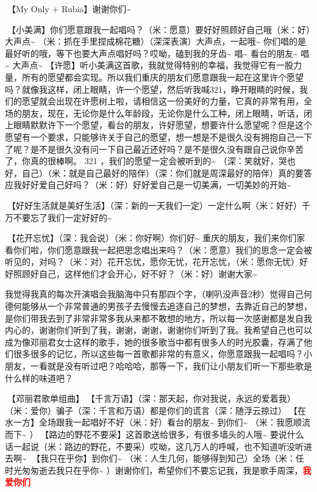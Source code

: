 \documentclass[
]{book}
\begin{document}
🎵【My Only + Rubia】谢谢你们\textasciitilde{}

🎵【小美满】你们愿意跟我一起唱吗？（米：愿意）要好好照顾好自己哦（米：好）大声点\textasciitilde{} （米：抓在手里捏成棉花糖）（深深表演）大声点，一起哦\textasciitilde{} 你们唱的是最好听的哦，等下也要大声点唱好吗？哎呦，磕到我的牙齿\textasciitilde{} 唱\textasciitilde{} 看台的朋友\textasciitilde{} 唱\textasciitilde{} 大声点\textasciitilde{} 【许愿】听小美满这首歌，我就觉得特别的幸福，我觉得它有一股力量，所有的愿望都会实现。所以我们重庆的朋友们愿意跟我一起在这里许个愿望吗？就像我这样，闭上眼睛，许一个愿望，然后听我喊321，睁开眼睛的时候，我们的愿望就会出现在许愿树上啦，请相信这一份美好的力量，它真的非常有用，全场的朋友，现在，无论你是什么年龄段，无论你是什么工种，闭上眼睛，听话，闭上眼睛默默许下一个愿望，看台的朋友，许好愿望，想要许什么愿望呢？但是这个愿望有一个要求，只能够许关于自己的愿望，想一想是不是很久没有拥抱自己一下了呢？是不是很久没有问一下自己最近还好吗？是不是很久没有跟自己说你辛苦了，你真的很棒啊。 321 ，我们的愿望一定会被听到的\textasciitilde{} （深：笑就好，哭也好，自己）（米：就是自己最好的陪伴）（深：你们就是周深最好的陪伴）真的要答应我好好爱自己好吗？（米：好）好好爱自己是一切美满，一切美妙的开始\textasciitilde{}

🎵【好好生活就是美好生活】（深：新的一天我们一定）一定什么啊（米：好好）千万不要忘了我们一定好好的\textasciitilde{}

🎵【花开忘忧】（深：我会说）（米：你好啊）你们好\textasciitilde{} 重庆的朋友，我们来你们家看你们啦，你们愿意跟我一起把思念唱出来吗？（米：愿意）我们的思念一定会被听见的，对吗？（米：对）花开忘忧，愿你无忧，花开忘忧，（米：愿你无忧）好好照顾好自己，这样他们才会开心，好不好？（米：好）谢谢大家\textasciitilde{}

我觉得我真的每次开演唱会我脑海中只有那四个字，（喇叭没声音2秒）觉得自己何德何能够从一个非常普通的男孩子去慢慢去追逐自己的梦想，去靠近自己的梦想，是你们带我去到了非常非常多我从来都不敢想的地方，所以每一次感谢都是发自我内心的，谢谢你们听到了我，谢谢，谢谢，谢谢你们听到了我。我希望自己也可以成为像邓丽君女士这样的歌手，她的很多歌当中都有很多人的时光胶囊，存满了他们很多很多的记忆，所以这些每一首歌都非常的有意义，你愿意跟我一起唱吗？小朋友，一看就是没有听过吧？哈哈哈，那等一下，我们让小朋友们听一下那些歌是什么样的味道吧？

🎵【邓丽君歌单组曲】🎵【千言万语】（深：那天起，你对我说，永远的爱着我）（米：爱你）骗子（深：千言和万语）都是你们的谎言（深：随浮云掠过）🎵【在水一方】全场跟我一起唱好不好（米：好）看台的朋友\textasciitilde{} 到你们\textasciitilde{} （米：我愿顺流而下\textasciitilde{} ）🎵【路边的野花不要采】这首歌送给很多，有很多墙头的人哦\textasciitilde{} 要说什么话一起说（米：路边的野花，不要采）哎呦，这几万人的呼喊，也不知道听没听进去啊\textasciitilde{} 🎵【我只在乎你】到你们\textasciitilde{} （米：人生几何，能够得到知己）全场（米：任时光匆匆逝去我只在乎你\textasciitilde{} ）谢谢你们，希望你们不要忘记我，我是歌手周深，\textbf{\textcolor{red}{我爱你们~} }
\end{document}
